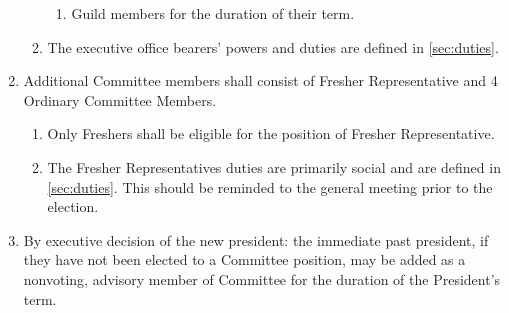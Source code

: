 \documentclass[a4paper]{article}
\begin{document}
\begin{enumerate}
\begin{enumerate}
\begin{enumerate}
                        \item Guild members for the duration of their term.
                    \end{enumerate}
              \item The executive office bearers' powers and duties are defined in \cref{sec:duties}.
          \end{enumerate}
    \item Additional Committee members shall consist of Fresher Representative and 4 Ordinary Committee Members.
          \begin{enumerate}
              \item \label{item:frep_is_fresh} Only Freshers shall be eligible for the position of Fresher Representative.
              \item The Fresher Representatives duties are primarily social and are defined in \cref{sec:duties}. This should be reminded to the general meeting prior to the election.
          \end{enumerate}
    \item By executive decision of the new president: the immediate past president, if they have not been elected to a Committee position, may be added as a nonvoting, advisory member of Committee for the duration of the President's term.
\end{enumerate}
\end{document}
